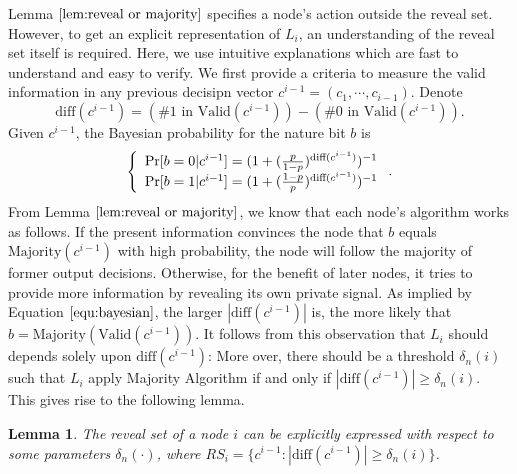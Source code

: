 \documentclass[a4paper,UKenglish]{lipics}
\newtheorem{lem}[thm]{Lemma}
\theoremstyle{definition}
\newcommand{\diff}{\text{diff}}
\begin{document}
Lemma $\ref{lem:reveal or majority}$ specifies a node's action outside the reveal set.
However, to get an explicit representation of $L_i$, an understanding of the reveal set itself is required.
Here, we use intuitive explanations which are fast to understand and easy to verify.
We first provide a criteria to measure the valid information in any previous decisipn vector $c^{i-1} = (c_1, \dotsb, c_{i-1})$.
Denote
\begin{equation*}
	\diff(c^{i-1}) 
	= 
	(\text{\# 1 in }\text{Valid}(c^{i-1})) - (\text{\# 0 in }\text{Valid}(c^{i-1})).
\end{equation*}
Given $c^{i-1}$, the Bayesian probability for the nature bit $b$ is 
\begin{equation}
\label{equ:bayesian}
\left\{
\begin{array} {l}
	\Pr[b = 0|c^{i-1}]
	= 
	(1 + ({p\over 1-p})^{\diff(c^{i-1})})^{-1}
\\
	\Pr[b = 1|c^{i-1}] 
	= 
	(1 + ({1-p\over p})^{\diff(c^{i-1})})^{-1} 
\end{array}
\right..
\end{equation}
From Lemma $\ref{lem:reveal or majority}$, we know that each node's algorithm works as follows.
If the present information convinces the node that $b$ equals $\text{Majority}(c^{i-1})$ with high probability, the node will follow the majority of former output decisions.
Otherwise, for the benefit of later nodes, it tries to provide more information by revealing its own private signal.
As implied by Equation $\eqref{equ:bayesian}$, the larger $|\diff(c^{i-1})|$ is, the more likely that $b = \text{Majority}(\text{Valid}(c^{i-1}))$. 
It follows from this observation that $L_i$ should depends solely upon $\diff(c^{i-1})$:
More over, there should be a threshold $\delta_n(i)$ such that $L_i$ apply Majority Algorithm if and only if $|\diff(c^{i-1})| \ge \delta_n(i)$. 
This gives rise to the following lemma.

\begin{lem}
\label{lem:reveal set threshold}
The reveal set of a node $i$ can be explicitly expressed with respect to some parameters $\delta_n(\cdot)$, where
	$RS_i = \{ c^{i-1} :|\diff(c^{i-1})| \ge \delta_n(i) \}$.
\end{lem}
\end{document}
